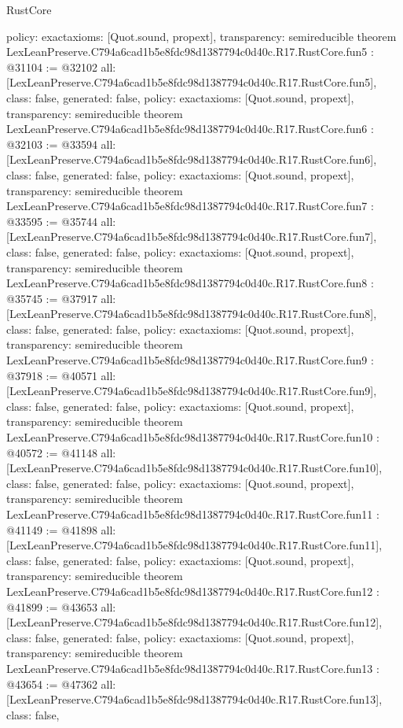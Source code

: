 \begin{lexlean}{RustCore}
\begin{coremodule}
{  policy: exact{axioms: [Quot.sound, propext]},
  transparency: semireducible
}
theorem LexLeanPreserve.C794a6cad1b5e8fdc98d1387794c0d40c.R17.RustCore.fun5 : @31104 := @32102 {
  all: [LexLeanPreserve.C794a6cad1b5e8fdc98d1387794c0d40c.R17.RustCore.fun5],
  class: false,
  generated: false,
  policy: exact{axioms: [Quot.sound, propext]},
  transparency: semireducible
}
theorem LexLeanPreserve.C794a6cad1b5e8fdc98d1387794c0d40c.R17.RustCore.fun6 : @32103 := @33594 {
  all: [LexLeanPreserve.C794a6cad1b5e8fdc98d1387794c0d40c.R17.RustCore.fun6],
  class: false,
  generated: false,
  policy: exact{axioms: [Quot.sound, propext]},
  transparency: semireducible
}
theorem LexLeanPreserve.C794a6cad1b5e8fdc98d1387794c0d40c.R17.RustCore.fun7 : @33595 := @35744 {
  all: [LexLeanPreserve.C794a6cad1b5e8fdc98d1387794c0d40c.R17.RustCore.fun7],
  class: false,
  generated: false,
  policy: exact{axioms: [Quot.sound, propext]},
  transparency: semireducible
}
theorem LexLeanPreserve.C794a6cad1b5e8fdc98d1387794c0d40c.R17.RustCore.fun8 : @35745 := @37917 {
  all: [LexLeanPreserve.C794a6cad1b5e8fdc98d1387794c0d40c.R17.RustCore.fun8],
  class: false,
  generated: false,
  policy: exact{axioms: [Quot.sound, propext]},
  transparency: semireducible
}
theorem LexLeanPreserve.C794a6cad1b5e8fdc98d1387794c0d40c.R17.RustCore.fun9 : @37918 := @40571 {
  all: [LexLeanPreserve.C794a6cad1b5e8fdc98d1387794c0d40c.R17.RustCore.fun9],
  class: false,
  generated: false,
  policy: exact{axioms: [Quot.sound, propext]},
  transparency: semireducible
}
theorem LexLeanPreserve.C794a6cad1b5e8fdc98d1387794c0d40c.R17.RustCore.fun10 : @40572 := @41148 {
  all: [LexLeanPreserve.C794a6cad1b5e8fdc98d1387794c0d40c.R17.RustCore.fun10],
  class: false,
  generated: false,
  policy: exact{axioms: [Quot.sound, propext]},
  transparency: semireducible
}
theorem LexLeanPreserve.C794a6cad1b5e8fdc98d1387794c0d40c.R17.RustCore.fun11 : @41149 := @41898 {
  all: [LexLeanPreserve.C794a6cad1b5e8fdc98d1387794c0d40c.R17.RustCore.fun11],
  class: false,
  generated: false,
  policy: exact{axioms: [Quot.sound, propext]},
  transparency: semireducible
}
theorem LexLeanPreserve.C794a6cad1b5e8fdc98d1387794c0d40c.R17.RustCore.fun12 : @41899 := @43653 {
  all: [LexLeanPreserve.C794a6cad1b5e8fdc98d1387794c0d40c.R17.RustCore.fun12],
  class: false,
  generated: false,
  policy: exact{axioms: [Quot.sound, propext]},
  transparency: semireducible
}
theorem LexLeanPreserve.C794a6cad1b5e8fdc98d1387794c0d40c.R17.RustCore.fun13 : @43654 := @47362 {
  all: [LexLeanPreserve.C794a6cad1b5e8fdc98d1387794c0d40c.R17.RustCore.fun13],
  class: false,
}
\end{coremodule}
\end{lexlean}
